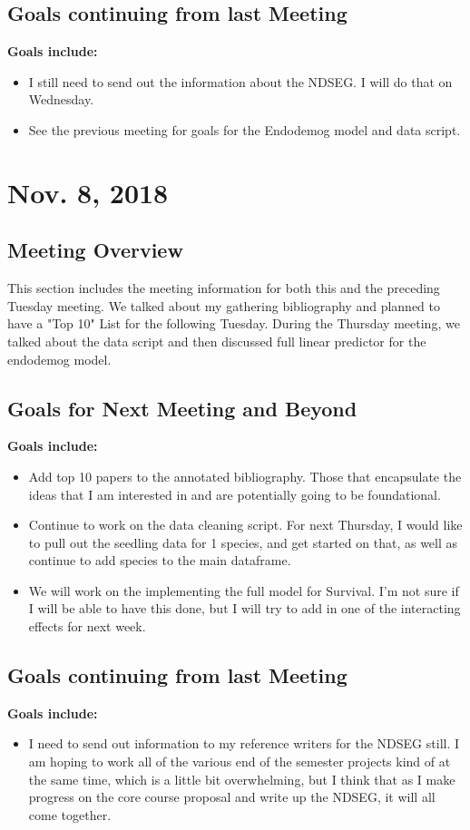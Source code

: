 \documentclass{article}
\begin{document}
\subsection*{Goals continuing from last Meeting}
\textbf{Goals include:}
\begin{itemize}
\item{I still need to send out the information about the NDSEG. I will do that on Wednesday.}
\item{See the previous meeting for goals for the Endodemog model and data script.}
\end{itemize}


\section*{Nov. 8, 2018}
\subsection*{Meeting Overview}

This section includes the meeting information for both this and the preceding Tuesday meeting. We talked about my gathering bibliography and planned to have a "Top 10" List for the following Tuesday. During the Thursday meeting, we talked about the data script and then discussed full linear predictor for the endodemog model.

\subsection*{Goals for Next Meeting and Beyond}
\textbf{Goals include:}
\begin{itemize}
\item{Add top 10 papers to the annotated bibliography. Those that encapsulate the ideas that I am interested in and are potentially going to be foundational.}
\item{Continue to work on the data cleaning script. For next Thursday, I would like to pull out the seedling data for 1 species, and get started on that, as well as continue to add species to the main dataframe.}
\item{We will work on the implementing the full model for Survival. I'm not sure if I will be able to have this done, but I will try to add in one of the interacting effects for next week.}
\end{itemize}

\subsection*{Goals continuing from last Meeting}
\textbf{Goals include:}
\begin{itemize}
\item{I need to send out information to my reference writers for the NDSEG still. I am hoping to work all of the various end of the semester projects kind of at the same time, which is a little bit overwhelming, but I think that as I make progress on the core course proposal and write up the NDSEG, it will all come together.}
\end{itemize}
\end{document}
